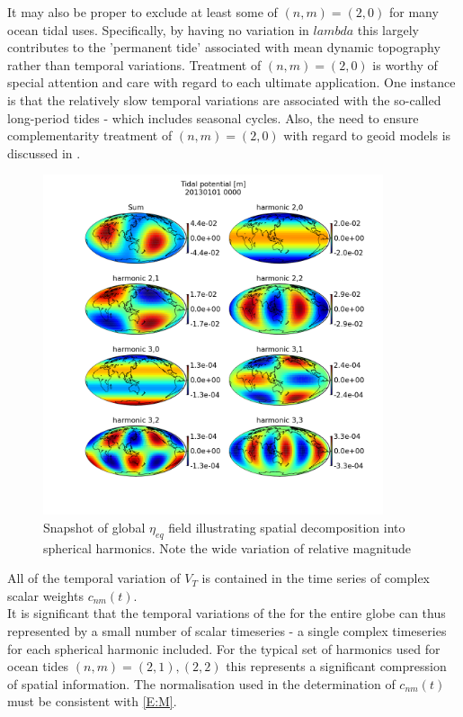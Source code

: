 It may also be proper to exclude at least some of $(n,m) = (2,0)$ for many ocean tidal uses.  Specifically, by having no variation in $lambda$ this largely contributes to the 'permanent tide' associated with mean dynamic topography rather than temporal variations.  Treatment of $(n,m) = (2,0)$ is worthy of special attention and care with regard to each ultimate application.  One instance is that the relatively slow temporal variations are associated with the so-called long-period tides - which includes seasonal cycles.  Also, the need to ensure complementarity treatment of $(n,m) = (2,0)$ with regard to geoid models is discussed in \cite[section 5.3.3.2]{Urban:2013vl}.

\begin{figure}[h]
\begin{center}
\includegraphics[width=100mm]{figures/maps/tidal_potential_spatial_20130101_0000.png}
\caption{Snapshot of global $\eta_{eq}$ field illustrating spatial decomposition into spherical harmonics.  Note the wide variation of relative magnitude}
\label{fig:VT_EG}
\end{center}
\end{figure}


All of the temporal variation of $V_T$ is contained in the time series of complex scalar weights $c_{nm}(t)$.\\
It is significant that the temporal variations of the \ATGP{} for the entire globe can thus represented by a small number of scalar timeseries - a single complex timeseries for each spherical harmonic included.  For the typical set of harmonics used for ocean tides $(n,m)=(2,1),(2,2)$ this represents a significant compression of spatial information.  The normalisation used in the determination of $c_{nm}(t)$ must be consistent with \ref{E:M}.\\

